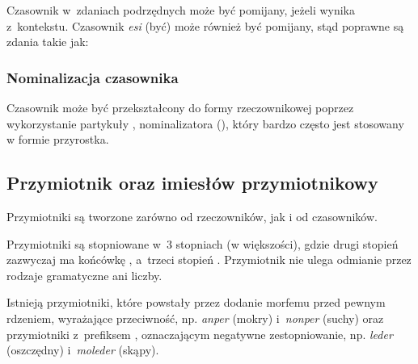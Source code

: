 \begin{spacing}{1.1}
Czasownik w~zdaniach podrzędnych może być pomijany, jeżeli wynika z~kontekstu.
Czasownik \emph{esi} (być) może również być pomijany, stąd poprawne są zdania
takie jak:




\subsubsection{Nominalizacja czasownika}

Czasownik może być przekształcony do formy rzeczownikowej poprzez wykorzystanie
partykuły , nominalizatora (\Nmlz{}), który bardzo często jest stosowany w
formie przyrostka.




\subsection{Przymiotnik oraz imiesłów przymiotnikowy}

Przymiotniki są tworzone zarówno od rzeczowników, jak i od czasowników.

Przymiotniki są stopniowane w~3 stopniach (w większości), gdzie drugi stopień
zazwyczaj ma końcówkę , a~trzeci stopień . Przymiotnik nie
ulega odmianie przez rodzaje gramatyczne ani liczby.

Istnieją przymiotniki, które powstały przez dodanie morfemu  przed
pewnym rdzeniem, wyrażające przeciwność, np. \emph{anper}  (mokry)
i~\emph{nonper}  (suchy) oraz przymiotniki z~prefiksem ,
oznaczającym negatywne zestopniowanie, np. \emph{leder}  (oszczędny)
i~\emph{moleder}  (skąpy).


\end{spacing}
